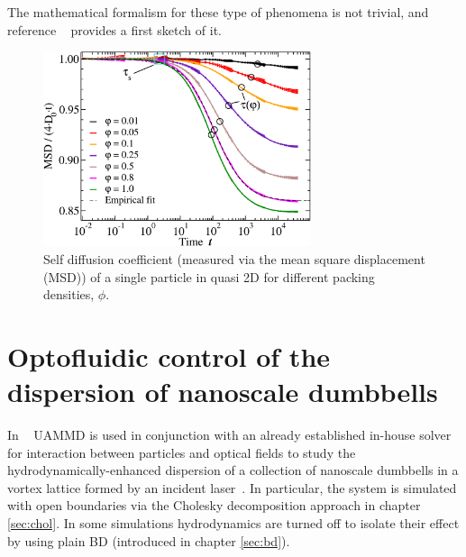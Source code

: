 \documentclass[ twoside,openright,titlepage,numbers=noenddot,%
headinclude,footinclude,cleardoublepage=empty,abstract=on,
BCOR=5mm,paper=b5,fontsize=11pt, dvipsnames
]{scrreprt}
\newcommand{\uammd}{\gls{UAMMD}\xspace}
\begin{document}
The mathematical formalism for these type of phenomena is not trivial, and reference ~\cite{Pelaez2018} provides a first sketch of it.
\begin{figure}[H]
  \centering
  \includegraphics[width=0.7\textwidth]{gfx/q2Dselfreduction}
  \caption{Self diffusion coefficient (measured via the mean square displacement (MSD)) of a single particle in quasi 2D for different packing densities, $\phi$.}
  \label{fig:q2Dselfreduction}
\end{figure}






\chapter{Optofluidic control of the dispersion of nanoscale dumbbells}

In ~\cite{Melendez2019} \uammd is used in conjunction with an already established in-house solver for interaction between particles and optical fields to study the hydrodynamically-enhanced dispersion of a collection of nanoscale dumbbells in a vortex lattice formed by an incident laser~\cite{Buscalioni2018}. In particular, the system is simulated with open boundaries via the Cholesky decomposition approach in chapter \ref{sec:chol}. In some simulations hydrodynamics are turned off to isolate their effect by using plain \gls{BD} (introduced in chapter \ref{sec:bd}).
\end{document}
